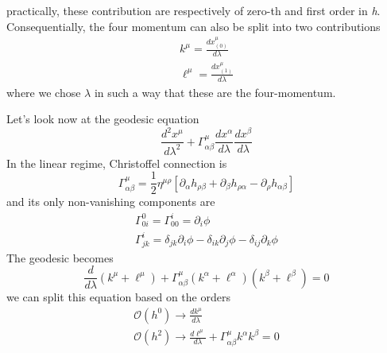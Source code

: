 practically, these contribution are respectively of zero-th and first order in \emph{h}.
Consequentially, the four momentum can also be split into two contributions
\begin{gather*}
k^{\mu } = \frac{d x^{\mu }_{\left( 0 \right)}}{d \lambda } \\
\ell^{\mu } = \frac{d x^{\mu }_{\left( 1 \right)}}{d \lambda }
\end{gather*}
where we chose $\lambda $ in such a way that these are the four-momentum.\par
Let's look now at the geodesic equation
\[
\frac{d ^{2}x^{\mu }}{d \lambda ^{2} } + \Gamma ^{\mu }_{\alpha \beta } \frac{d x^{\alpha }}{d \lambda }\frac{d x^{\beta }}{d \lambda }
\]
In the linear regime, Christoffel connection is
\[
\Gamma ^{\mu }_{\alpha \beta } = \frac{1}{2}\eta ^{\mu \rho }\left[ \partial_{\alpha }h_{\rho \beta }+ \partial_{\beta }h_{\rho \alpha } - \partial_{\rho }h_{\alpha \beta } \right]
\]
and its only non-vanishing components are
\begin{gather*}
\Gamma ^{0}_{0i} = \Gamma ^{i}_{00} = \partial_{i}\phi  \\
\Gamma ^{i}_{jk} = \delta _{jk}\partial_{i}\phi - \delta _{ik}\partial_{j} \phi - \delta _{ij}\partial_{k}\phi  
\end{gather*}
The geodesic becomes
\begin{equation}
\frac{d }{d \lambda }\left( k^{\mu }+ \ell^{\mu } \right) + \Gamma ^{\mu }_{\alpha \beta }\left( k^{\alpha }+ \ell^{\alpha } \right)\left( k^{\beta }+\ell^{\beta } \right) = 0
\end{equation}
we can split this equation based on the orders
\begin{gather*}
\mathcal{O} \left( h^{0} \right)  \to  \frac{d k^{\mu }}{d \lambda }\\
\mathcal{O} \left( h^{2} \right) \to \frac{d \ell^{\mu }}{d \lambda } + \Gamma ^{\mu }_{\alpha \beta }k^{\alpha }k^{\beta } = 0
\end{gather*}

